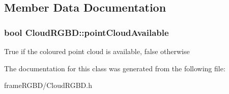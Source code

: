 \subsection{\-Member \-Data \-Documentation}
\hypertarget{classCloudRGBD_a7cffb7e84dcd3c721486cf9e4cd74a64}{
\subsubsection[{point\-Cloud\-Available}]{\setlength{\rightskip}{0pt plus 5cm}bool {\bf \-Cloud\-R\-G\-B\-D\-::point\-Cloud\-Available}}}\label{classCloudRGBD_a7cffb7e84dcd3c721486cf9e4cd74a64}
\-True if the coloured point cloud is available, false otherwise 

\-The documentation for this class was generated from the following file\-:\begin{DoxyCompactItemize}
\item 
frame\-R\-G\-B\-D/\-Cloud\-R\-G\-B\-D.\-h\end{DoxyCompactItemize}
